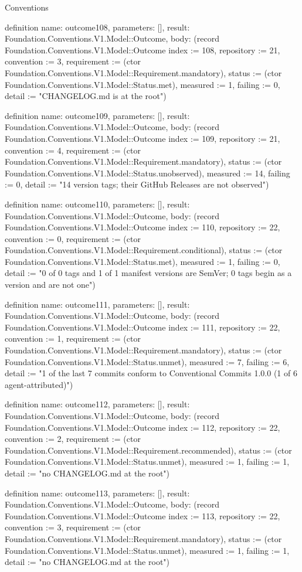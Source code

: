 \begin{lexlean}{Conventions}
\begin{semanticmodule}
definition{
  name: outcome108,
  parameters: [],
  result: Foundation.Conventions.V1.Model::Outcome,
  body: (record Foundation.Conventions.V1.Model::Outcome {index := 108, repository := 21, convention := 3, requirement := (ctor Foundation.Conventions.V1.Model::Requirement.mandatory), status := (ctor Foundation.Conventions.V1.Model::Status.met), measured := 1, failing := 0, detail := "CHANGELOG.md is at the root"})
}

definition{
  name: outcome109,
  parameters: [],
  result: Foundation.Conventions.V1.Model::Outcome,
  body: (record Foundation.Conventions.V1.Model::Outcome {index := 109, repository := 21, convention := 4, requirement := (ctor Foundation.Conventions.V1.Model::Requirement.mandatory), status := (ctor Foundation.Conventions.V1.Model::Status.unobserved), measured := 14, failing := 0, detail := "14 version tags; their GitHub Releases are not observed"})
}

definition{
  name: outcome110,
  parameters: [],
  result: Foundation.Conventions.V1.Model::Outcome,
  body: (record Foundation.Conventions.V1.Model::Outcome {index := 110, repository := 22, convention := 0, requirement := (ctor Foundation.Conventions.V1.Model::Requirement.conditional), status := (ctor Foundation.Conventions.V1.Model::Status.met), measured := 1, failing := 0, detail := "0 of 0 tags and 1 of 1 manifest versions are SemVer; 0 tags begin as a version and are not one"})
}

definition{
  name: outcome111,
  parameters: [],
  result: Foundation.Conventions.V1.Model::Outcome,
  body: (record Foundation.Conventions.V1.Model::Outcome {index := 111, repository := 22, convention := 1, requirement := (ctor Foundation.Conventions.V1.Model::Requirement.mandatory), status := (ctor Foundation.Conventions.V1.Model::Status.unmet), measured := 7, failing := 6, detail := "1 of the last 7 commits conform to Conventional Commits 1.0.0 (1 of 6 agent-attributed)"})
}

definition{
  name: outcome112,
  parameters: [],
  result: Foundation.Conventions.V1.Model::Outcome,
  body: (record Foundation.Conventions.V1.Model::Outcome {index := 112, repository := 22, convention := 2, requirement := (ctor Foundation.Conventions.V1.Model::Requirement.recommended), status := (ctor Foundation.Conventions.V1.Model::Status.unmet), measured := 1, failing := 1, detail := "no CHANGELOG.md at the root"})
}

definition{
  name: outcome113,
  parameters: [],
  result: Foundation.Conventions.V1.Model::Outcome,
  body: (record Foundation.Conventions.V1.Model::Outcome {index := 113, repository := 22, convention := 3, requirement := (ctor Foundation.Conventions.V1.Model::Requirement.mandatory), status := (ctor Foundation.Conventions.V1.Model::Status.unmet), measured := 1, failing := 1, detail := "no CHANGELOG.md at the root"})
}


\end{semanticmodule}
\end{lexlean}
